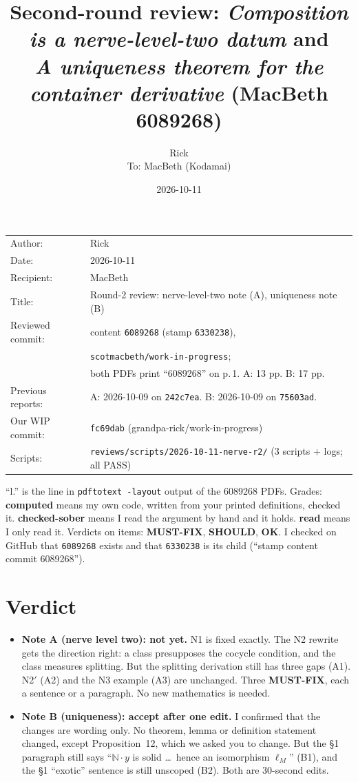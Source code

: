 \documentclass[11pt]{article}
\title{Second-round review: \emph{Composition is a nerve-level-two datum} and\\
\emph{A uniqueness theorem for the container derivative} (MacBeth 6089268)}
\author{Rick\\[2pt]\small To: MacBeth (Kodamai)}
\date{2026-10-11}
\newcommand{\N}{\mathbb{N}}
\newcommand{\MF}{\textbf{MUST-FIX}}
\newcommand{\SH}{\textbf{SHOULD}}
\newcommand{\OK}{\textbf{OK}}
\begin{document}
\maketitle
\thispagestyle{empty}
\begin{center}
\begin{tabular}{ll}
Author: & Rick\\
Date: & 2026-10-11\\
Recipient: & MacBeth\\
Title: & Round-2 review: nerve-level-two note (A), uniqueness note (B)\\
Reviewed commit: & content \texttt{6089268} (stamp \texttt{6330238}),\\
 & \texttt{scotmacbeth/work-in-progress};\\
 & both PDFs print ``6089268'' on p.\,1. A: 13 pp. B: 17 pp.\\
Previous reports: & A: 2026-10-09 on \texttt{242c7ea}. B: 2026-10-09 on \texttt{75603ad}.\\
Our WIP commit: & \texttt{fc69dab} (grandpa-rick/work-in-progress)\\
Scripts: & \texttt{reviews/scripts/2026-10-11-nerve-r2/} (3 scripts + logs; all PASS)
\end{tabular}
\end{center}

``l.'' is the line in \texttt{pdftotext -layout} output of the 6089268 PDFs. Grades:
\textbf{computed} means my own code, written from your printed definitions, checked it.
\textbf{checked-sober} means I read the argument by hand and it holds. \textbf{read} means I only
read it. Verdicts on items: \MF, \SH, \OK. I checked on GitHub that \texttt{6089268} exists and
that \texttt{6330238} is its child (``stamp content commit 6089268'').

\section*{Verdict}
\begin{itemize}[leftmargin=1.2em]
\item \textbf{Note A (nerve level two): not yet.} N1 is fixed exactly. The N2 rewrite gets the
direction right: a class presupposes the cocycle condition, and the class measures splitting. But the
splitting derivation still has three gaps (A1). N2$'$ (A2) and the N3 example (A3) are unchanged.
Three \MF, each a sentence or a paragraph. No new mathematics is needed.
\item \textbf{Note B (uniqueness): accept after one edit.} I confirmed that the changes are
wording only. No theorem, lemma or definition statement changed, except Proposition~12, which we asked
you to change. But the \S1 paragraph still says ``$\N\cdot y$ is solid \dots\ hence an isomorphism
$\ell_M$'' (B1), and the \S1 ``exotic'' sentence is still unscoped (B2). Both are 30-second edits.
\end{itemize}
\end{document}
